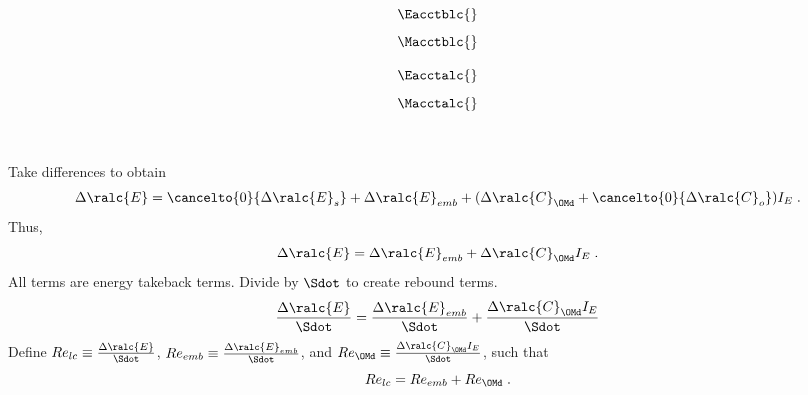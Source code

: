 

\begin{landscape}

\linespread{1}


\sectionsep{}

{
  \begin{equation}
  \Eacctblc{}
  \end{equation}
}
{
  \begin{equation}
  \Macctblc{}
  \end{equation}
}

\sectionsep{}

{
  \begin{equation}
  \Eacctalc{}
  \end{equation}
}
{
  \begin{equation}
  \Macctalc{}
  \end{equation}
}

\sectionsep{}

\derivsection{}
{
    ~
    
    Take differences to obtain
  \begin{equation}
  \Delta \ralc{E} = \cancelto{0}{\Delta \ralc{E}_s}
  + \Delta \ralc{E}_{emb}
  + (\Delta \ralc{C}_{\OMd} + \cancelto{0}{\Delta \ralc{C}_o}) I_E \; .
  \end{equation}
  Thus, 
  \begin{equation}
  \Delta \ralc{E} = \Delta \ralc{E}_{emb} + \Delta \ralc{C}_{\OMd} I_E \; .
  \end{equation}
All terms are energy takeback terms.
Divide by $\Sdot$
to create rebound terms.
  \begin{equation}
  \frac{\Delta \ralc{E}}{\Sdot} = \frac{\Delta \ralc{E}_{emb}}{\Sdot} + \frac{\Delta \ralc{C}_{\OMd} I_E}{\Sdot}
  \end{equation}
  Define
  $Re_{lc} \equiv \frac{\Delta \ralc{E}}{\Sdot}$, 
  $Re_{emb} \equiv \frac{\Delta \ralc{E}_{emb}}{\Sdot}$, and
  $Re_{\OMd} \equiv \frac{\Delta \ralc{C}_{\OMd} I_E}{\Sdot}$,
  such that
  \begin{equation}
  Re_{lc} = Re_{emb} + Re_{\OMd} \; .
  \end{equation}
}
{
    ~
    
}
\end{landscape}
